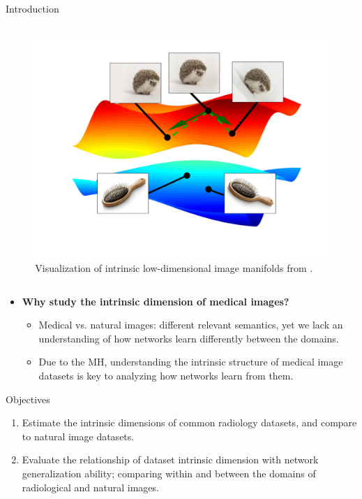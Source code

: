 \documentclass[final,hyperref={pdfpagelabels=false}]{beamer}
\begin{document}
\begin{frame}[t]
\begin{columns}[t]
\begin{column}{.47\textwidth}
\begin{block}{Introduction}
\begin{columns}
\begin{column}{.43\textwidth} %
\centering
\begin{figure}
    \includegraphics[width=0.8\linewidth]{buchanan_etal_fig1.pdf}
     \caption{\,Visualization of intrinsic low-dimensional image manifolds from \cite{buchanan2021deep}.}
\end{figure}
\end{column}
\end{columns} %
\begin{itemize}
\item \vspace{0.5cm} \textbf{Why study the intrinsic dimension of medical images?}
    \begin{itemize}
        \item Medical vs. natural images: different relevant semantics, yet we lack an understanding of how networks learn differently between the domains.
        \item Due to the MH, understanding the intrinsic structure of medical image datasets is key to analyzing how networks learn from them.
    \end{itemize}
\end{itemize}

\end{block}

\begin{block}{Objectives}

\begin{enumerate}
\item Estimate the intrinsic dimensions of common radiology datasets, and compare to natural image datasets.
\item Evaluate the relationship of dataset intrinsic dimension with network generalization ability; comparing within and between the domains of radiological and natural images.
\end{enumerate}


\end{block}
\end{column}
\end{columns}
\end{frame}
\end{document}
